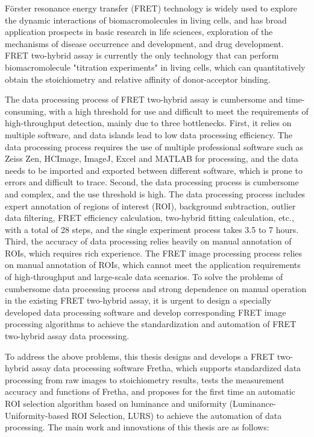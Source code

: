 \begin{eabstract}

Förster resonance energy transfer (FRET) technology is widely used to explore the dynamic interactions of biomacromolecules in living cells, and has broad application prospects in basic research in life sciences, exploration of the mechanisms of disease occurrence and development, and drug development.
FRET two-hybrid assay is currently the only technology that can perform biomacromolecule "titration experiments" in living cells, which can quantitatively obtain the stoichiometry and relative affinity of donor-acceptor binding.

The data processing process of FRET two-hybrid assay is cumbersome and time-consuming, with a high threshold for use and difficult to meet the requirements of high-throughput detection, mainly due to three bottlenecks.
First, it relies on multiple software, and data islands lead to low data processing efficiency.
The data processing process requires the use of multiple professional software such as Zeiss Zen, HCImage, ImageJ, Excel and MATLAB for processing, and the data needs to be imported and exported between different software, which is prone to errors and difficult to trace.
Second, the data processing process is cumbersome and complex, and the use threshold is high.
The data processing process includes expert annotation of regions of interest (ROI), background subtraction, outlier data filtering, FRET efficiency calculation, two-hybrid fitting calculation, etc., with a total of 28 steps, and the single experiment process takes 3.5 to 7 hours.
Third, the accuracy of data processing relies heavily on manual annotation of ROIs, which requires rich experience.
The FRET image processing process relies on manual annotation of ROIs, which cannot meet the application requirements of high-throughput and large-scale data scenarios.
To solve the problems of cumbersome data processing process and strong dependence on manual operation in the existing FRET two-hybrid assay, it is urgent to design a specially developed data processing software and develop corresponding FRET image processing algorithms to achieve the standardization and automation of FRET two-hybrid assay data processing.

To address the above problems, this thesis designs and develops a FRET two-hybrid assay data processing software Fretha, which supports standardized data processing from raw images to stoichiometry results, tests the measurement accuracy and functions of Fretha, and proposes for the first time an automatic ROI selection algorithm based on luminance and uniformity (Luminance-Uniformity-based ROI Selection, LURS) to achieve the automation of data processing.
The main work and innovations of this thesis are as follows:


\end{eabstract}
